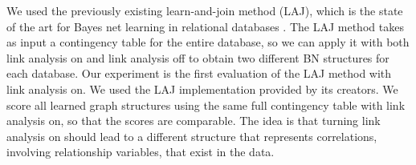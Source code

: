 \documentclass{sig-alternate-2013}
\begin{document}
We used the previously existing learn-and-join method (LAJ), which is the state of the art for Bayes net learning in relational databases \cite{Schulte2012}. The LAJ method takes as input a contingency table for the entire database, so we can apply it with both link analysis on and link analysis off to obtain two different BN structures for each database. Our experiment is the first evaluation of the LAJ method with link analysis on. We used the LAJ implementation provided by its creators.
%
%
We score all learned graph structures using the same full contingency table with link analysis on, so that the scores are comparable. The idea is that turning link analysis on should lead to a different structure that represents correlations, involving relationship variables, that exist in the data.
\end{document}
